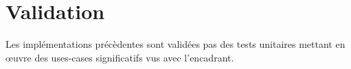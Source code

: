 \documentclass[a4paper]{article}
\begin{document}
\section{Validation}
Les implémentations précèdentes sont validées pas des tests unitaires mettant
en œuvre des uses-cases significatifs vus avec l'encadrant.

\newpage
{}


\end{document}

